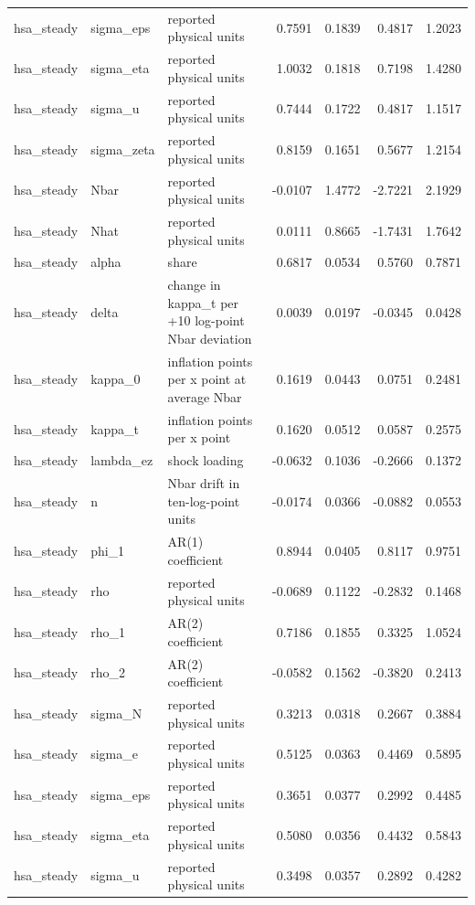 \begin{tabular}{lllrrrr}
hsa\_steady & sigma\_eps & reported physical units & 0.7591 & 0.1839 & 0.4817 & 1.2023 \\
hsa\_steady & sigma\_eta & reported physical units & 1.0032 & 0.1818 & 0.7198 & 1.4280 \\
hsa\_steady & sigma\_u & reported physical units & 0.7444 & 0.1722 & 0.4817 & 1.1517 \\
hsa\_steady & sigma\_zeta & reported physical units & 0.8159 & 0.1651 & 0.5677 & 1.2154 \\
hsa\_steady & Nbar & reported physical units & -0.0107 & 1.4772 & -2.7221 & 2.1929 \\
hsa\_steady & Nhat & reported physical units & 0.0111 & 0.8665 & -1.7431 & 1.7642 \\
hsa\_steady & alpha & share & 0.6817 & 0.0534 & 0.5760 & 0.7871 \\
hsa\_steady & delta & change in kappa\_t per +10 log-point Nbar deviation & 0.0039 & 0.0197 & -0.0345 & 0.0428 \\
hsa\_steady & kappa\_0 & inflation points per x point at average Nbar & 0.1619 & 0.0443 & 0.0751 & 0.2481 \\
hsa\_steady & kappa\_t & inflation points per x point & 0.1620 & 0.0512 & 0.0587 & 0.2575 \\
hsa\_steady & lambda\_ez & shock loading & -0.0632 & 0.1036 & -0.2666 & 0.1372 \\
hsa\_steady & n & Nbar drift in ten-log-point units & -0.0174 & 0.0366 & -0.0882 & 0.0553 \\
hsa\_steady & phi\_1 & AR(1) coefficient & 0.8944 & 0.0405 & 0.8117 & 0.9751 \\
hsa\_steady & rho & reported physical units & -0.0689 & 0.1122 & -0.2832 & 0.1468 \\
hsa\_steady & rho\_1 & AR(2) coefficient & 0.7186 & 0.1855 & 0.3325 & 1.0524 \\
hsa\_steady & rho\_2 & AR(2) coefficient & -0.0582 & 0.1562 & -0.3820 & 0.2413 \\
hsa\_steady & sigma\_N & reported physical units & 0.3213 & 0.0318 & 0.2667 & 0.3884 \\
hsa\_steady & sigma\_e & reported physical units & 0.5125 & 0.0363 & 0.4469 & 0.5895 \\
hsa\_steady & sigma\_eps & reported physical units & 0.3651 & 0.0377 & 0.2992 & 0.4485 \\
hsa\_steady & sigma\_eta & reported physical units & 0.5080 & 0.0356 & 0.4432 & 0.5843 \\
hsa\_steady & sigma\_u & reported physical units & 0.3498 & 0.0357 & 0.2892 & 0.4282 \\

\end{tabular}
